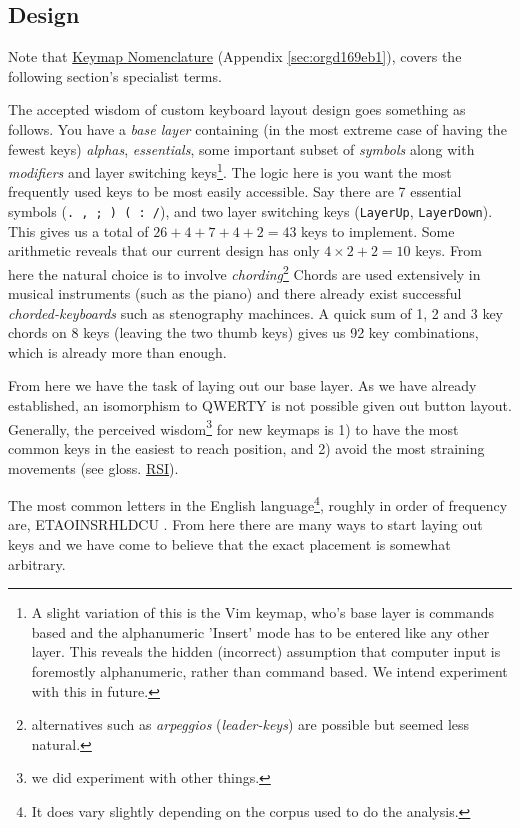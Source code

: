 \documentclass[logo,bsc,singlespacing,parskip]{infthesis}
\begin{document}
\subsection{Design}
\label{sec:orgad6e02f}
Note that \hyperref[sec:orgd169eb1]{Keymap Nomenclature} (Appendix \ref{sec:orgd169eb1}), covers the following section's specialist terms.

The accepted wisdom of custom keyboard layout design goes something as follows.
You have a \emph{base layer} containing (in the most extreme case of having the fewest keys) \emph{alphas}, \emph{essentials}, some important subset of \emph{symbols} along with \emph{modifiers} and layer switching keys\footnote{A slight variation of this is the Vim \autocite{WelcomeHomeVim} keymap, who's base layer is commands based and the alphanumeric 'Insert' mode has to be entered like any other layer. This reveals the hidden (incorrect) assumption that computer input is foremostly alphanumeric, rather than command based. We intend experiment with this in future.}.
The logic here is you want the most frequently used keys to be most easily accessible.
Say there are 7 essential symbols (\texttt{. , ; ) ( : /}), and two layer switching keys (\texttt{LayerUp}, \texttt{LayerDown}).
This gives us a total of \(26+4+7+4+2=43\) keys to implement.
Some arithmetic reveals that our current design has only \(4\times2 + 2 = 10\) keys.
From here the natural choice is to involve \emph{chording}\footnote{alternatives such as \emph{arpeggios} (\emph{leader-keys}) are possible but seemed less natural.}
Chords are used extensively in musical instruments (such as the piano) and there already exist successful \emph{chorded-keyboards} such as stenography machinces.
A quick sum of 1, 2 and 3 key chords on 8 keys (leaving the two thumb keys) gives us 92 key combinations, which is already more than enough.

From here we have the task of laying out our base layer.
As we have already established, an isomorphism to QWERTY is not possible given out button layout.
Generally, the perceived wisdom\footnote{we did experiment with other things.} for new keymaps is 1) to have the most common keys in the easiest to reach position, and 2) avoid the most straining movements (see gloss. \hyperref[org503fc2d]{RSI}).

The most common letters in the English language\footnote{It does vary slightly depending on the corpus used to do the analysis.}, roughly in order of frequency are, ETAOINSRHLDCU \autocite{norvigEnglishLetterFrequency}.
From here there are many ways to start laying out keys and we have come to believe that the exact placement is somewhat arbitrary.
\end{document}
